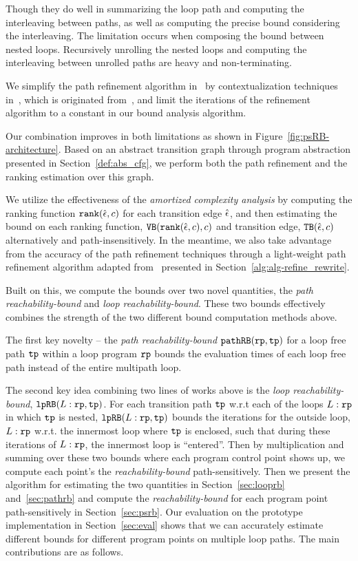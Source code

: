 \begin{itemize}
  Though they do well in summarizing the loop path and computing the interleaving between paths, as well as computing the precise bound considering the interleaving.
  The limitation occurs when composing the bound between nested loops. Recursively unrolling the nested loops and computing the interleaving between unrolled paths are heavy and non-terminating.

  We simplify the path refinement algorithm in~\cite{GulwaniJK09} by contextualization techniques in~\cite{ZulegerGSV11,SinnZV14}, which is originated from~\cite{ManoliosV06},
and limit the iterations of the refinement algorithm to a constant in our bound analysis algorithm.
\end{itemize}
Our combination improves in both limitations as shown in Figure~\ref{fig:psRB-architecture}.
Based on an abstract transition graph through program abstraction presented in Section~\ref{def:abs_cfg},
we perform both the path refinement and the ranking estimation over this graph.

We utilize the effectiveness of the \emph{amortized complexity analysis} by computing the ranking function $\mathtt{rank}(\hat{\mathtt{\epsilon}{}}, c)$ for each transition edge $\hat{\mathtt{\epsilon}{}}$, and then estimating the bound on each ranking function, ${\mathtt{VB}}(\mathtt{rank}(\hat{\mathtt{\epsilon}{}}, c), c)$ and transition edge, ${\mathtt{TB}}(\hat{\mathtt{\epsilon}{}}, c)$ alternatively and path-insensitively.
In the meantime, we also take advantage from the accuracy of the path refinement techniques through a light-weight path refinement algorithm adapted from~\cite{GulwaniJK09} presented in Section~\ref{alg:alg-refine_rewrite}.

Built on this, we compute the bounds over two novel quantities, the \emph{path reachability-bound} and \emph{loop reachability-bound}. These two bounds effectively combines the strength of the two different bound computation methods above.

The first key novelty -- the \emph{path reachability-bound} $\mathtt{pathRB}(\mathtt{rp}, \mathtt{tp})$ for a loop free path $\mathtt{tp}$ within a loop program $\mathtt{rp}$ bounds the evaluation times of each loop free path instead of the entire multipath loop.

The second key idea combining two lines of works above is the \emph{loop reachability-bound}, $\mathtt{lpRB}(L:\mathtt{rp}, \mathtt{tp})$.
For each transition path $\mathtt{tp}$ w.r.t each of the loops $L:\mathtt{rp}$ in which $\mathtt{tp}$ is nested,
$\mathtt{lpRB}(L:\mathtt{rp}, \mathtt{tp})$ bounds the iterations for
the outside loop, $L:\mathtt{rp}$ w.r.t. the innermost loop where $\mathtt{tp}$ is enclosed,
such that during these iterations of $L:\mathtt{rp}$, the innermost loop is ``entered''. 
Then by multiplication and summing over these two bounds where each program control point shows up, we compute each point's the \emph{reachability-bound} path-sensitively.
Then we present the algorithm for estimating the two quantities in Section~\ref{sec:looprb} and~\ref{sec:pathrb} and compute the \emph{reachability-bound} for each program point path-sensitively in Section~\ref{sec:psrb}.
Our evaluation on the prototype implementation in Section~\ref{sec:eval} shows that we can accurately estimate different bounds for different program points on multiple loop paths. The main contributions are as follows.

